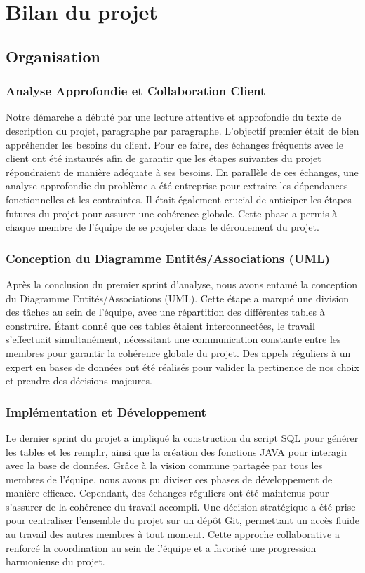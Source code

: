 \chapter{Bilan du projet}
\section{Organisation}
\subsection{Analyse Approfondie et Collaboration Client}
Notre démarche a débuté par une lecture attentive et approfondie du texte de description du projet, paragraphe par paragraphe. L'objectif premier était de bien appréhender les besoins du client. Pour ce faire, des échanges fréquents avec le client ont été instaurés afin de garantir que les étapes suivantes du projet répondraient de manière adéquate à ses besoins. En parallèle de ces échanges, une analyse approfondie du problème a été entreprise pour extraire les dépendances fonctionnelles et les contraintes. Il était également crucial de anticiper les étapes futures du projet pour assurer une cohérence globale. Cette phase a permis à chaque membre de l'équipe de se projeter dans le déroulement du projet.
\subsection{Conception du Diagramme Entités/Associations (UML)}
Après la conclusion du premier sprint d'analyse, nous avons entamé la conception du Diagramme Entités/Associations (UML). Cette étape a marqué une division des tâches au sein de l'équipe, avec une répartition des différentes tables à construire. Étant donné que ces tables étaient interconnectées, le travail s'effectuait simultanément, nécessitant une communication constante entre les membres pour garantir la cohérence globale du projet. Des appels réguliers à un expert en bases de données ont été réalisés pour valider la pertinence de nos choix et prendre des décisions majeures.
\subsection{Implémentation et Développement}
Le dernier sprint du projet a impliqué la construction du script SQL pour générer les tables et les remplir, ainsi que la création des fonctions JAVA pour interagir avec la base de données. Grâce à la vision commune partagée par tous les membres de l'équipe, nous avons pu diviser ces phases de développement de manière efficace. Cependant, des échanges réguliers ont été maintenus pour s'assurer de la cohérence du travail accompli. Une décision stratégique a été prise pour centraliser l'ensemble du projet sur un dépôt Git, permettant un accès fluide au travail des autres membres à tout moment. Cette approche collaborative a renforcé la coordination au sein de l'équipe et a favorisé une progression harmonieuse du projet.



